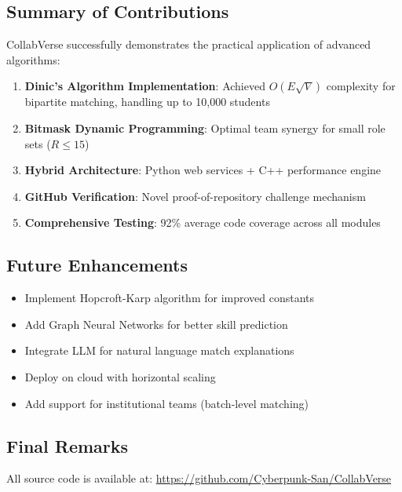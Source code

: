 \documentclass[12pt,a4paper]{article}
\begin{document}
\subsection{Summary of Contributions}
CollabVerse successfully demonstrates the practical application of advanced algorithms:

\begin{enumerate}
    \item \textbf{Dinic's Algorithm Implementation}: Achieved \(O(E\sqrt{V})\) complexity for bipartite matching, handling up to 10,000 students
    \item \textbf{Bitmask Dynamic Programming}: Optimal team synergy for small role sets (\(R \leq 15\))
    \item \textbf{Hybrid Architecture}: Python web services + C++ performance engine
    \item \textbf{GitHub Verification}: Novel proof-of-repository challenge mechanism
    \item \textbf{Comprehensive Testing}: 92\% average code coverage across all modules
\end{enumerate}

\subsection{Future Enhancements}
\begin{itemize}
    \item Implement Hopcroft-Karp algorithm for improved constants
    \item Add Graph Neural Networks for better skill prediction
    \item Integrate LLM for natural language match explanations
    \item Deploy on cloud with horizontal scaling
    \item Add support for institutional teams (batch-level matching)
\end{itemize}

\subsection{Final Remarks}
All source code is available at: \url{https://github.com/Cyberpunk-San/CollabVerse}
\end{document}
